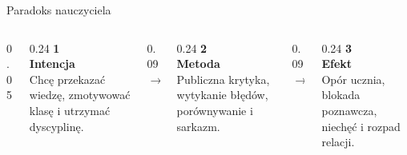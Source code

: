 \documentclass[10pt, aspectratio=169]{beamer}
\begin{document}
\begin{frame}{Paradoks nauczyciela}
    \vspace{0.4cm}
    \begin{columns}[T]
        \begin{column}{0.05\textwidth}
        \end{column}
        
        \begin{column}{0.24\textwidth}
            {\fontsize{40}{40}\selectfont\sffamily\bfseries\textcolor{primaryNavy!10}{1}}\\[-0.7cm]
            {\large\bfseries\textcolor{primaryNavy}{Intencja}}\\[0.3cm]
            \small\textcolor{textPrimary}{Chcę przekazać wiedzę, zmotywować klasę i utrzymać dyscyplinę.}
        \end{column}
        
        \begin{column}{0.09\textwidth}
            \vspace{1.2cm}
            \centering\textcolor{textMuted}{\Large $\rightarrow$}
        \end{column}
        
        \begin{column}{0.24\textwidth}
            {\fontsize{40}{40}\selectfont\sffamily\bfseries\textcolor{accentCoral!10}{2}}\\[-0.7cm]
            {\large\bfseries\textcolor{accentCoral}{Metoda}}\\[0.3cm]
            \small\textcolor{textPrimary}{Publiczna krytyka, wytykanie błędów, porównywanie i sarkazm.}
        \end{column}
        
        \begin{column}{0.09\textwidth}
            \vspace{1.2cm}
            \centering\textcolor{textMuted}{\Large $\rightarrow$}
        \end{column}
        
        \begin{column}{0.24\textwidth}
            {\fontsize{40}{40}\selectfont\sffamily\bfseries\textcolor{primaryNavy!10}{3}}\\[-0.7cm]
            {\large\bfseries\textcolor{primaryNavy}{Efekt}}\\[0.3cm]
            \small\textcolor{textPrimary}{Opór ucznia, blokada poznawcza, niechęć i rozpad relacji.}
        \end{column}
        

\end{columns}
\end{frame}
\end{document}
